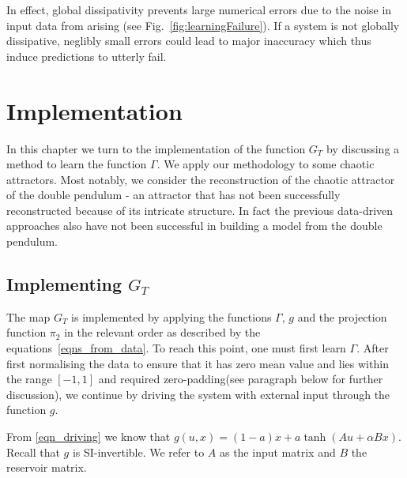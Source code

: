 \documentclass[a4paper,12pt,twoside]{report}
\begin{document}
In effect, global dissipativity prevents large numerical errors due to the noise in input data from arising (see Fig.~\ref{fig:learningFailure}). 
If a system is not globally dissipative, neglibly small errors could lead to major inaccuracy which thus induce predictions to utterly fail.



\chapter{Implementation} \label{ch5}

In this chapter we turn to the implementation of the function $G_T$ by discussing a method to learn the function $\Gamma$. We apply our methodology to some chaotic attractors. Most notably, we consider the reconstruction of the chaotic attractor of the double pendulum - an  attractor that has not been successfully reconstructed because of its intricate structure. In fact the previous data-driven approaches also have not been successful in building a model from the double pendulum. 




\section{Implementing $G_T$}
The map $G_T$ is implemented by applying the functions $\Gamma$, $g$ and the projection function $\pi_2$ in the relevant order as described by the equations~\ref{eqns_from_data}. To reach this point, one must first learn $\Gamma$.
After first normalising the data to ensure that it has zero mean value and lies within the range $[-1,1]$ and required zero-padding(see paragraph below for further discussion), we continue by driving the system with external input through the function $g$.

From \eqref{eqn_driving} we know that $g(u,x) = (1-a) x + a \tanh(Au + \alpha B x)$. Recall that $g$ is SI-invertible. We refer to $A$ as the input matrix and $B$ the reservoir matrix. 
\end{document}
